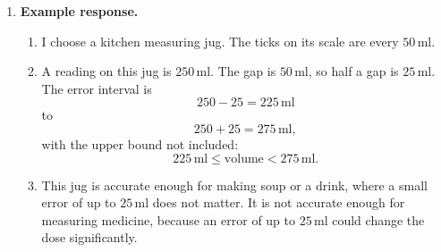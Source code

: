\documentclass[11pt,a4paper]{article}
\begin{document}
\begin{enumerate}[label=\textbf{Q\arabic*.}, start=13, leftmargin=*, itemsep=8pt]
\begin{solbox}
For a reading of \(80\,\text{cm}\) on a metre rule marked in centimetres, one gap is \(1\,\text{cm}\), so half a gap is \(0.5\,\text{cm}\). The error interval is
\[
80-0.5=79.5\,\text{cm}
\]
to
\[
80+0.5=80.5\,\text{cm},
\]
with the upper bound not included:
\[
79.5\,\text{cm}\le \text{length}<80.5\,\text{cm}.
\]
Both the shelf and the gap between the walls have this same error interval. It is possible that the shelf is near the top of its interval, say \(80.4\,\text{cm}\), and the gap is near the bottom, say \(79.6\,\text{cm}\). Then the shelf would not fit. To guarantee that it fits, we would need the lower bound of the gap to be greater than the upper bound of the shelf, which we do not know here.
\end{solbox}

\item 
\begin{solbox}
\textbf{Example response.}
\begin{enumerate}[label=(\alph*), leftmargin=*, itemsep=4pt]
\item I choose a kitchen measuring jug. The ticks on its scale are every \(50\,\text{ml}\).
\item A reading on this jug is \(250\,\text{ml}\). The gap is \(50\,\text{ml}\), so half a gap is \(25\,\text{ml}\). The error interval is
\[
250-25=225\,\text{ml}
\]
to
\[
250+25=275\,\text{ml},
\]
with the upper bound not included:
\[
\boxed{225\,\text{ml}\le \text{volume}<275\,\text{ml}}.
\]
\item This jug is accurate enough for making soup or a drink, where a small error of up to \(25\,\text{ml}\) does not matter. It is not accurate enough for measuring medicine, because an error of up to \(25\,\text{ml}\) could change the dose significantly.
\end{enumerate}
\end{solbox}

\end{enumerate}
\end{document}
